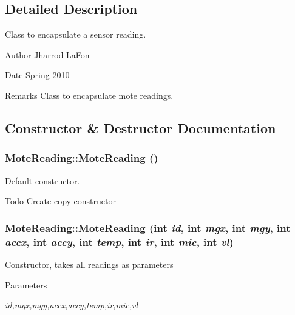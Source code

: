 \subsection{Detailed Description}
Class to encapsulate a sensor reading. \begin{DoxyAuthor}{Author}
Jharrod LaFon 
\end{DoxyAuthor}
\begin{DoxyDate}{Date}
Spring 2010 
\end{DoxyDate}
\begin{DoxyRemark}{Remarks}
Class to encapsulate mote readings. 
\end{DoxyRemark}


\subsection{Constructor \& Destructor Documentation}
\hypertarget{classMoteReading_ad2555254ab4fd4ce31ebafeea362d255}{
\subsubsection[{MoteReading}]{\setlength{\rightskip}{0pt plus 5cm}MoteReading::MoteReading ()}}
\label{classMoteReading_ad2555254ab4fd4ce31ebafeea362d255}


Default constructor. 

\begin{Desc}
\item[\hyperlink{todo__todo000003}{Todo}]Create copy constructor \end{Desc}
\hypertarget{classMoteReading_aea4d9a40d3999ed29eb6044146a5dabc}{
\subsubsection[{MoteReading}]{\setlength{\rightskip}{0pt plus 5cm}MoteReading::MoteReading (int {\em id}, \/  int {\em mgx}, \/  int {\em mgy}, \/  int {\em accx}, \/  int {\em accy}, \/  int {\em temp}, \/  int {\em ir}, \/  int {\em mic}, \/  int {\em vl})}}
\label{classMoteReading_aea4d9a40d3999ed29eb6044146a5dabc}
Constructor, takes all readings as parameters 
\begin{DoxyParams}{Parameters}
\item[{\em id,mgx,mgy,accx,accy,temp,ir,mic,vl}]\end{DoxyParams}


